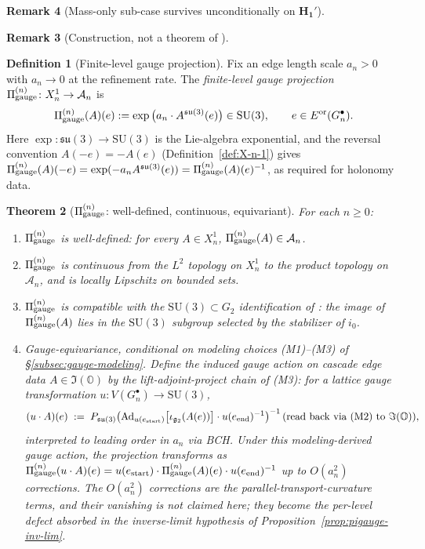 \documentclass[11pt, a4paper]{amsart}
\newtheorem{theorem}{Theorem}[section]
\theoremstyle{definition}
\newtheorem{definition}[theorem]{Definition}
\newtheorem{remark}[theorem]{Remark}
\newcommand{\OO}{\mathbb{O}}
\newcommand{\gge}{{\rm gauge}}
\begin{document}
\begin{remark}[Mass-only sub-case survives unconditionally on $\mathbf{H_1'}$]
\begin{remark}[Construction, not a theorem of \cite{CascadeEmbeddings}]
\begin{definition}[Finite-level gauge projection]
\label{def:pigauge-n}
Fix an edge length scale $a_n > 0$ with $a_n \to 0$ at the
refinement rate. The \emph{finite-level gauge projection}
$\Pi_{\gge}^{(n)} \colon X_n^1 \to \mathcal{A}_n$ is
\[
  \Pi_{\gge}^{(n)}(A)(e)
  := \exp\big( a_n \cdot A^{\mathfrak{su}(3)}(e) \big)
  \in \mathrm{SU}(3),
  \qquad e \in E^{\rm or}(G_n^{\bullet}).
\]
Here $\exp \colon \mathfrak{su}(3) \to \mathrm{SU}(3)$ is the
Lie-algebra exponential, and the reversal convention $A(-e) = -A(e)$
(Definition~\ref{def:X-n-1}) gives
$\Pi_{\gge}^{(n)}(A)(-e) = \exp(-a_n A^{\mathfrak{su}(3)}(e)) =
\Pi_{\gge}^{(n)}(A)(e)^{-1}$, as required for holonomy data.
\end{definition}

\begin{theorem}[$\Pi_{\gge}^{(n)}$: well-defined, continuous,
equivariant]
\label{thm:pigauge-n}
For each $n \geq 0$:
\begin{enumerate}
\item $\Pi_{\gge}^{(n)}$ is well-defined: for every $A \in X_n^1$,
  $\Pi_{\gge}^{(n)}(A) \in \mathcal{A}_n$.
\item $\Pi_{\gge}^{(n)}$ is continuous from the $L^2$ topology on
  $X_n^1$ to the product topology on $\mathcal{A}_n$, and is
  locally Lipschitz on bounded sets.
\item $\Pi_{\gge}^{(n)}$ is compatible with the $\mathrm{SU}(3)
  \subset G_2$ identification of
  \cite[\S 6]{CascadeEmbeddings}: the image of
  $\Pi_{\gge}^{(n)}(A)$ lies in the $\mathrm{SU}(3)$ subgroup
  selected by the stabilizer of $i_0$.
\item \emph{Gauge-equivariance, conditional on modeling choices
  (M1)--(M3) of \S\ref{subsec:gauge-modeling}.}
  Define the induced gauge action on cascade edge data $A \in
  \Im(\OO)$ by the lift-adjoint-project chain of (M3): for a
  lattice gauge transformation $u \colon V(G_n^{\bullet}) \to
  \mathrm{SU}(3)$,
  \[
    (u \cdot A)(e) \;:=\; P_{\mathfrak{su}(3)}\bigl(
      \mathrm{Ad}_{u(e_{\rm start})} \bigl[\iota_{\mathfrak{g}_2}(A(e))\bigr]
      \cdot u(e_{\rm end})^{-1}\bigr)^{-1}\!
    \text{ (read back via (M2) to } \Im(\OO) \text{)},
  \]
  interpreted to leading order in $a_n$ via BCH. Under this
  modeling-derived gauge action, the projection transforms as
  $\Pi_{\gge}^{(n)}(u \cdot A)(e) = u(e_{\rm start}) \cdot
  \Pi_{\gge}^{(n)}(A)(e) \cdot u(e_{\rm end})^{-1}$ up to $O(a_n^2)$
  corrections. The $O(a_n^2)$ corrections are the
  parallel-transport-curvature terms, and their vanishing is
  \emph{not} claimed here; they become the per-level defect
  absorbed in the inverse-limit hypothesis of
  Proposition~\ref{prop:pigauge-inv-lim}.
\end{enumerate}
\end{theorem}


\end{remark}
\end{remark}
\end{document}
